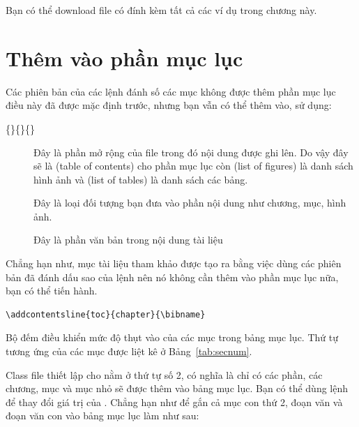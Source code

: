 \documentclass[a4paper]{report}
\begin{document}
Bạn có thể download file  có đính kèm tất cả các ví dụ trong chương này.


\section{Thêm vào phần mục lục}

Các phiên bản của các lệnh đánh số các mục không được thêm phần mục lục điều này đã được mặc định trước, nhưng bạn vẫn có thể thêm vào, sử dụng:

\begin{definition}
\{\}\{\}\{\}
\end{definition}%
\begin{description}
\item[\normalfont{}]
Đây là phần mở rộng của file trong đó nội dung được ghi lên.
Do vậy đây sẽ là  (table of contents) cho phần mục lục còn  (list of figures) là danh sách hình ảnh và  (list of tables) là danh sách các bảng.

\item[\normalfont{}]
Đây là loại đối tượng bạn đưa vào phần nội dung như chương, mục, hình ảnh.

\item[\normalfont{}]
Đây là phần văn bản trong nội dung tài liệu
\end{description}

\noindent Chẳng hạn như, mục tài liệu tham khảo được tạo ra bằng việc dùng các phiên bản đã đánh dấu sao của lệnh  nên nó không cần thêm vào phần mục lục nữa, bạn có thể tiến hành.

\begin{verbatim}
\addcontentsline{toc}{chapter}{\bibname}
\end{verbatim}

\noindent Bộ đếm  điều khiển mức độ thụt vào của các mục trong bảng mục lục. Thứ tự  tương ứng của các mục được liệt kê ở Bảng~\ref{tab:secnum}.

\noindent Class file  thiết lập cho   nằm ở thứ tự số 2, có nghĩa là chỉ có các phần, các chương, mục và mục nhỏ sẽ được thêm vào bảng mục lục. Bạn có thể dùng  lệnh  để thay đổi giá trị của . Chẳng hạn như để gắn cả mục con thứ 2, đoạn văn và đoạn văn con vào bảng mục lục làm như sau:
\end{document}
